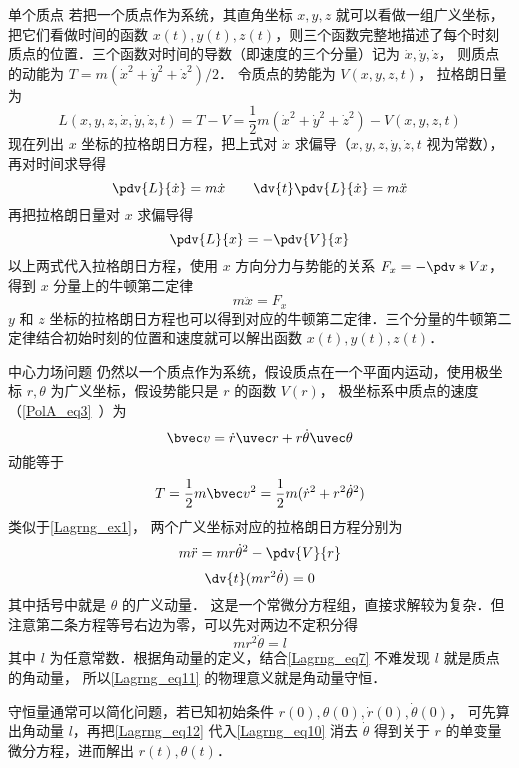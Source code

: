 \begin{example}{单个质点}\label{Lagrng_ex1}
若把一个质点作为系统，其直角坐标 $x,y,z$ 就可以看做一组广义坐标，把它们看做时间的函数 $x(t), y(t), z(t)$，则三个函数完整地描述了每个时刻质点的位置．三个函数对时间的导数（即速度的三个分量）记为 $\dot x, \dot y, \dot z$， 则质点的动能为 $T=m(\dot x^2+\dot y^2+\dot z^2)/2$． 令质点的势能为 $V(x,y,z,t)$， 拉格朗日量为
\begin{equation}
L(x,y,z, \dot x, \dot y, \dot z, t) = T-V = \frac12 m(\dot x^2+\dot y^2+\dot z^2) - V(x,y,z,t)
\end{equation}
现在列出 $x$ 坐标的拉格朗日方程，把上式对 $\dot x$ 求偏导（$x, y,z, \dot y, \dot z, t$ 视为常数），再对时间求导得
\begin{equation}
\pdv{L}{\dot x} = m\dot x
\qquad
\dv{t} \pdv{L}{\dot x} = m\ddot x
\end{equation}
再把拉格朗日量对 $x$ 求偏导得
\begin{equation}
\pdv{L}{x} = -\pdv{V}{x}
\end{equation}
以上两式代入拉格朗日方程，使用 $x$ 方向分力与势能的关系 $F_x = -\pdv*{V}{x}$， 得到 $x$ 分量上的牛顿第二定律
\begin{equation}
m\ddot x = F_x
\end{equation}
$y$ 和 $z$ 坐标的拉格朗日方程也可以得到对应的牛顿第二定律．三个分量的牛顿第二定律结合初始时刻的位置和速度就可以解出函数 $x(t), y(t), z(t)$． 
\end{example}

\begin{example}{中心力场问题}
仍然以一个质点作为系统，假设质点在一个平面内运动，使用极坐标 $r, \theta$ 为广义坐标，假设势能只是 $r$ 的函数 $V(r)$， 极坐标系中质点的速度（\autoref{PolA_eq3}~）为
\begin{equation}\label{Lagrng_eq7}
\bvec v = \dot r\uvec r + r\dot \theta \uvec \theta
\end{equation}
动能等于
\begin{equation}
T = \frac12 m\bvec v^2 = \frac12 m(\dot r^2 + r^2 \dot \theta^2)
\end{equation}
类似于\autoref{Lagrng_ex1}， 两个广义坐标对应的拉格朗日方程分别为
\begin{equation}\label{Lagrng_eq10}
m\ddot r = mr \dot \theta^2 - \pdv{V}{r}
\end{equation}
\begin{equation}\label{Lagrng_eq11}
\dv{t} (m r^2\dot \theta)  = 0
\end{equation}
其中括号中就是 $\theta$ 的广义动量． 这是一个常微分方程组，直接求解较为复杂．但注意第二条方程等号右边为零，可以先对两边不定积分得
\begin{equation}\label{Lagrng_eq12}
mr^2\dot\theta = l
\end{equation}
其中 $l$ 为任意常数．根据角动量的定义，结合\autoref{Lagrng_eq7} 不难发现 $l$ 就是质点的角动量， 所以\autoref{Lagrng_eq11} 的物理意义就是角动量守恒．

守恒量通常可以简化问题，若已知初始条件 $r(0), \theta (0), \dot r(0), \dot\theta (0)$， 可先算出角动量 $l$，再把\autoref{Lagrng_eq12} 代入\autoref{Lagrng_eq10} 消去 $\dot\theta$ 得到关于 $r$ 的单变量微分方程，进而解出 $r(t), \theta (t)$．
\end{example}

